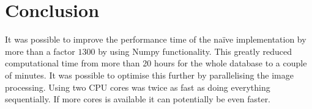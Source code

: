 \section{Conclusion}
It was possible to improve the performance time of the na\"ive implementation by more than a factor $ 1300 $ by using Numpy functionality. This greatly reduced computational time from more than 20 hours for the whole database to a couple of minutes. It was possible to optimise this further by parallelising the image processing. Using two CPU cores was twice as fast as doing everything sequentially. If more cores is available it can potentially be even faster.